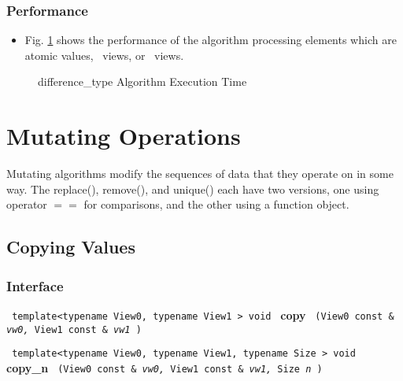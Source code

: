 \subsubsection{Performance} %

\begin{itemize}
\item
Fig. \ref{fig:diff-type-alg-exec-exper}
shows the performance of the algorithm processing
elements which are atomic values, \stl\ views, or \stapl\ views.
\end{itemize}

\begin{figure}[p]
\caption{difference\_type Algorithm Execution Time}
\label{fig:diff-type-alg-exec-exper}
\end{figure}


\section{Mutating Operations} \label{sec-mutate-alg}

Mutating algorithms modify the sequences of data that they operate on in some way. The replace(), remove(), and unique() each have two versions, one using operator $==$ for comparisons, and the other using a function object.


\subsection{Copying Values} \label{sec-muta-copy}

\subsubsection{Interface} %

\noindent
\texttt{%
template<typename View0, typename View1 >
\newline
void 
}
\newline
\textbf{copy}%
\texttt{%
(View0 const \&
\textit{vw0,}%
View1 const \&
\textit{vw1}%
)
}
\vspace{0.4cm}

\noindent
\texttt{%
template<typename View0, typename View1, typename Size >
\newline
void 
}
\newline
\textbf{copy\_n}%
\texttt{%
(View0 const \&
\textit{vw0,}%
View1 const \&
\textit{vw1,}%
Size 
\textit{n}%
)
}

